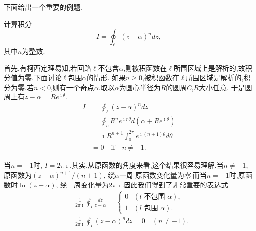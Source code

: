下面给出一个重要的例题.
\begin{example}
计算积分\[ I = \oint_\ell (z-\alpha)^n dz, \]其中$n$为整数.
\end{example}
\begin{solution}
首先,有柯西定理易知,若回路$\ell$不包含$\alpha$,则被积函数在$\ell$所围区域上是解析的,故积分值为零.下面讨论$\ell$包围$\alpha$的情形.
如果$n\geq 0$,被积函数在$\ell$所围区域是解析的,积分为零.若$n<0$,则有一个奇点$\alpha$.取以$\alpha$为圆心半径为$R$的圆周$C$,$R$大小任意.
于是圆周上有$z-\alpha = Re^{\imath \theta}$.
$$
\begin{aligned}
    I &= \oint_\ell (z-\alpha)^n dz\\
     &= \oint_c R^n e^{\imath n \theta} d (\alpha + R e^{\imath \theta})\\
     & =  \imath R^{n+1} \int_0^{2\pi} e^{\imath (n+1)\theta}  d\theta \\
     & = 0 \quad \textrm{if} \quad n\neq -1.
\end{aligned}
$$

当$n = -1$时, $I = 2\pi \imath$.其实,从原函数的角度来看,这个结果很容易理解.当$n\neq -1$,原函数为$(z-\alpha)^{n+1}/(n+1)$, 绕$\alpha$一周
原函数变化量为零.而当$n=-1$时,原函数时$\ln(z-\alpha)$, 绕一周变化量为$2\pi \imath$.因此我们得到了非常重要的表达式
$$
    \begin{aligned}
        & \frac{1}{2 \pi \imath} \oint_l \frac{d z}{z-\alpha}= \begin{cases}0 & (l \text { 不包围 } \alpha), \\
        1 & (l \text { 包围 } \alpha) . \end{cases} \\
        & \frac{1}{2 \pi \imath} \oint_l(z-\alpha)^n d z=0 \quad(n \neq-1) .
        \end{aligned}
$$
\end{solution}